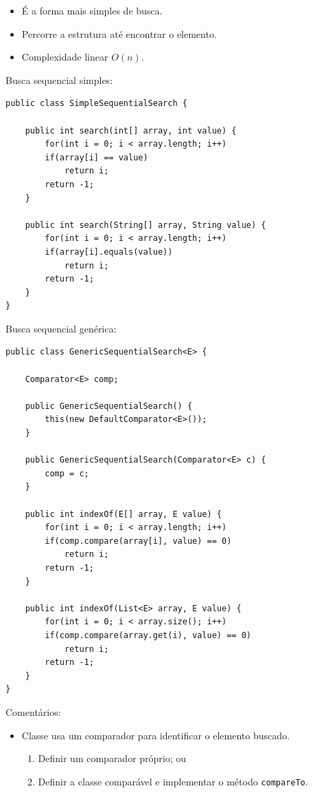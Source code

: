 \clearpage


\begin{itemize}
	\item É a forma mais simples de busca.
	\item Percorre a estrutura até encontrar o elemento.
	\item Complexidade linear $O(n)$.
\end{itemize}

\medskip

Busca sequencial simples:
\begin{verbatim}
public class SimpleSequentialSearch {
	
	public int search(int[] array, int value) {
		for(int i = 0; i < array.length; i++)
		if(array[i] == value)
			return i;
		return -1;
	}
	
	public int search(String[] array, String value) {
		for(int i = 0; i < array.length; i++)
		if(array[i].equals(value))
			return i;	
		return -1;
	}
}
\end{verbatim}

\medskip

Busca sequencial genérica:
\begin{verbatim}
public class GenericSequentialSearch<E> {
	
	Comparator<E> comp;
	
	public GenericSequentialSearch() {
		this(new DefaultComparator<E>());
	}
	
	public GenericSequentialSearch(Comparator<E> c) {
		comp = c;
	}
	
	public int indexOf(E[] array, E value) {
		for(int i = 0; i < array.length; i++)
		if(comp.compare(array[i], value) == 0)
			return i;
		return -1;
	}
	
	public int indexOf(List<E> array, E value) {
		for(int i = 0; i < array.size(); i++)
		if(comp.compare(array.get(i), value) == 0)
			return i;
		return -1;
	}
}
\end{verbatim}

\medskip

{\color{redtext}
Comentários:
\begin{itemize}
	\item Classe usa um comparador para identificar o elemento buscado.
	\begin{enumerate}
		\item Definir um comparador próprio; ou
		\item Definir a classe comparável e implementar o método \texttt{compareTo}.
	\end{enumerate}
\end{itemize}
}

